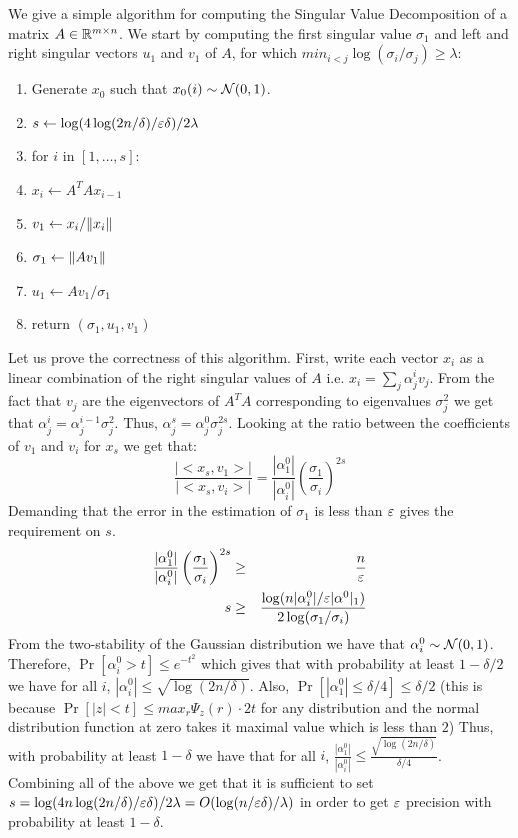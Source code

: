 \documentclass{article}
\begin{document}
We give a simple algorithm for computing the Singular Value Decomposition of a matrix $A \in {\mathbb{R}}^{m \times n}$.
We start by computing the first singular value $\sigma_1$ and left and right singular vectors $u_1$ and $v_1$ of $A$,
for which $min_{i<j}\log(\sigma_i/\sigma_j) \ge \lambda$:
\begin{enumerate}
\item Generate $x_0$ such that $x_0(i) \sim {\mathcal{N}}(0,1)$.
\item $s \leftarrow  \log(4\log(2n/\delta)/\varepsilon\delta)/2\lambda$ 
\item for $i$ in $[1,\ldots,s]$:
\item \tab $x_i \leftarrow A^{T}Ax_{i-1}$
\item $v_1 \leftarrow x_i/\| x_i \|$  
\item $\sigma_1 \leftarrow \| Av_1 \|$
\item $u_1 \leftarrow Av_1/\sigma_1$ 
\item return $(\sigma_1,u_1,v_1)$ 
\end{enumerate}
Let us prove the correctness of this algorithm.
First, write each vector $x_i$ as a linear combination of the right singular values of $A$ i.e. $x_i = \sum_{j} \alpha^{i}_{j}v_j$. 
From the fact that $v_j$ are the eigenvectors of $A^{T}A$ corresponding to eigenvalues $\sigma^{2}_j$ 
we get that $\alpha^{i}_{j}= \alpha^{i-1}_{j}\sigma^{2}_{j}$.
Thus, $\alpha^{s}_{j} = \alpha^{0}_{j}\sigma^{2s}_{j}$. Looking at the ratio between the coefficients of $v_1$ and $v_i$ for $x_s$
we get that:
 \[
 \frac{|<x_s,v_1>|}{|<x_s,v_i>|} = \frac{|\alpha^{0}_{1}|}{|\alpha^{0}_{i}|}\left(\frac{\sigma_1}{\sigma_i}\right)^{2s}
\]
Demanding that the error in the estimation of $\sigma_1$ is less than $\varepsilon$ gives the requirement on $s$.
\begin{eqnarray}
\frac{|\alpha^{0}_{1}|}{|\alpha^{0}_{i}|}\left(\frac{\sigma_1}{\sigma_i}\right)^{2s} &\ge& \frac{n}{\varepsilon}\\
s &\ge& \frac{\log(n|\alpha^{0}_i|/\varepsilon|\alpha^{0}|_1)}{2\log(\sigma_1/\sigma_i)}
\end{eqnarray}
From the two-stability of the Gaussian distribution we have that $\alpha^{0}_i \sim {\mathcal{N}}(0,1)$. 
Therefore, $\Pr[\alpha^{0}_i > t] \le e^{-t^2}$ which gives that with probability at least $1-\delta/2$ we have for
all $i$, $|\alpha^{0}_i | \le \sqrt{\log(2n/\delta)}$. Also, $\Pr[|\alpha^{0}_1 | \le \delta/4 ] \le \delta/2$ (this is because 
$\Pr[|z| < t] \le max_{r}\Psi_{z}(r)\cdot2t$ for any distribution and the normal distribution function at zero takes it maximal value which is less than $2$) 
Thus, with probability at least $1-\delta$ we have that for all $i$, $\frac{|\alpha^{0}_{1}|}{|\alpha^{0}_{i}|} \le \frac{\sqrt{\log(2n/\delta)}}{\delta/4}$.
Combining all of the above we get that it is sufficient to set $s = \log(4n\log(2n/\delta)/\varepsilon\delta)/2\lambda = O(\log(n/\varepsilon\delta)/\lambda)$
in order to get $\varepsilon$ precision with probability at least $1-\delta$.
\end{document}
